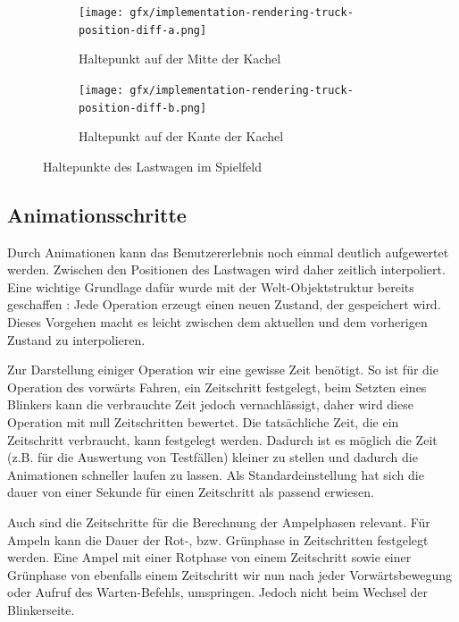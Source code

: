 
\begin{figure}
  \begin{subfigure}[b]{0.45\textwidth}
    \texttt{[image: gfx/implementation-rendering-truck-position-diff-a.png]}
    \caption{Haltepunkt auf der Mitte der Kachel}
    \label{fig:implementation:rendering:truck-position:diff:a}
  \end{subfigure}\hfill
  \begin{subfigure}[b]{0.45\textwidth}
    \texttt{[image: gfx/implementation-rendering-truck-position-diff-b.png]}
    \caption{Haltepunkt auf der Kante der Kachel}
    \label{fig:implementation:rendering:truck-position:diff:b}
  \end{subfigure}\hfill
  \caption{Haltepunkte des Lastwagen im Spielfeld}
  \label{fig:implementation:rendering:truck-position:diff}
\end{figure}

\subsection{Animationsschritte}
\label{sec:implementation:rendering:animation}

Durch Animationen kann das Benutzererlebnis noch einmal deutlich aufgewertet werden. Zwischen den Positionen des Lastwagen wird daher zeitlich interpoliert. Eine wichtige Grundlage dafür wurde mit der Welt-Objektstruktur bereits geschaffen : Jede Operation erzeugt einen neuen Zustand, der gespeichert wird. Dieses Vorgehen macht es leicht zwischen dem aktuellen und dem vorherigen Zustand zu interpolieren.

Zur Darstellung einiger Operation wir eine gewisse Zeit benötigt. So ist für die Operation des vorwärts Fahren, ein Zeitschritt festgelegt, beim Setzten eines Blinkers kann die verbrauchte Zeit jedoch vernachlässigt, daher wird diese Operation mit null Zeitschritten bewertet. Die tatsächliche Zeit, die ein Zeitschritt verbraucht, kann festgelegt werden. Dadurch ist es möglich die Zeit (z.B. für die Auswertung von Testfällen) kleiner zu stellen und dadurch die Animationen schneller laufen zu lassen. Als Standardeinstellung hat sich die dauer von einer Sekunde für einen Zeitschritt als passend erwiesen.

Auch sind die Zeitschritte für die Berechnung der Ampelphasen relevant. Für Ampeln kann die Dauer der Rot-, bzw. Grünphase in Zeitschritten festgelegt werden. Eine Ampel mit einer Rotphase von einem Zeitschritt sowie einer Grünphase von ebenfalls einem Zeitschritt wir nun nach jeder Vorwärtsbewegung oder Aufruf des Warten-Befehls, umspringen. Jedoch nicht beim Wechsel der Blinkerseite. 

